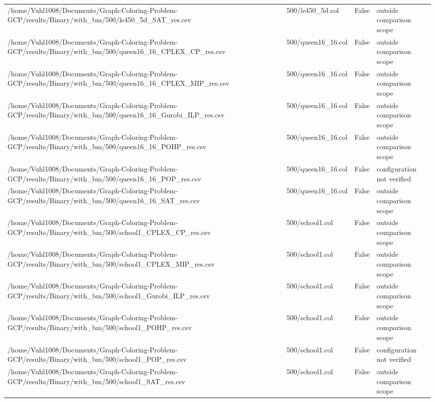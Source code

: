 \begin{table}[htbp]
\begin{tabular}{llll}
/home/Vuhl1008/Documents/Graph-Coloring-Problem-GCP/results/Binary/with\_bm/500/le450\_5d\_SAT\_res.csv & 500/le450\_5d.col & False & outside comparison scope \\
/home/Vuhl1008/Documents/Graph-Coloring-Problem-GCP/results/Binary/with\_bm/500/queen16\_16\_CPLEX\_CP\_res.csv & 500/queen16\_16.col & False & outside comparison scope \\
/home/Vuhl1008/Documents/Graph-Coloring-Problem-GCP/results/Binary/with\_bm/500/queen16\_16\_CPLEX\_MIP\_res.csv & 500/queen16\_16.col & False & outside comparison scope \\
/home/Vuhl1008/Documents/Graph-Coloring-Problem-GCP/results/Binary/with\_bm/500/queen16\_16\_Gurobi\_ILP\_res.csv & 500/queen16\_16.col & False & outside comparison scope \\
/home/Vuhl1008/Documents/Graph-Coloring-Problem-GCP/results/Binary/with\_bm/500/queen16\_16\_POHP\_res.csv & 500/queen16\_16.col & False & outside comparison scope \\
/home/Vuhl1008/Documents/Graph-Coloring-Problem-GCP/results/Binary/with\_bm/500/queen16\_16\_POP\_res.csv & 500/queen16\_16.col & False & configuration not verified \\
/home/Vuhl1008/Documents/Graph-Coloring-Problem-GCP/results/Binary/with\_bm/500/queen16\_16\_SAT\_res.csv & 500/queen16\_16.col & False & outside comparison scope \\
/home/Vuhl1008/Documents/Graph-Coloring-Problem-GCP/results/Binary/with\_bm/500/school1\_CPLEX\_CP\_res.csv & 500/school1.col & False & outside comparison scope \\
/home/Vuhl1008/Documents/Graph-Coloring-Problem-GCP/results/Binary/with\_bm/500/school1\_CPLEX\_MIP\_res.csv & 500/school1.col & False & outside comparison scope \\
/home/Vuhl1008/Documents/Graph-Coloring-Problem-GCP/results/Binary/with\_bm/500/school1\_Gurobi\_ILP\_res.csv & 500/school1.col & False & outside comparison scope \\
/home/Vuhl1008/Documents/Graph-Coloring-Problem-GCP/results/Binary/with\_bm/500/school1\_POHP\_res.csv & 500/school1.col & False & outside comparison scope \\
/home/Vuhl1008/Documents/Graph-Coloring-Problem-GCP/results/Binary/with\_bm/500/school1\_POP\_res.csv & 500/school1.col & False & configuration not verified \\
/home/Vuhl1008/Documents/Graph-Coloring-Problem-GCP/results/Binary/with\_bm/500/school1\_SAT\_res.csv & 500/school1.col & False & outside comparison scope \\

\end{tabular}
\end{table}
